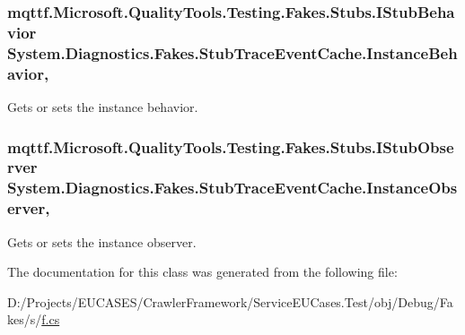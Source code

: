 \hypertarget{class_system_1_1_diagnostics_1_1_fakes_1_1_stub_trace_event_cache_aebba5c60a0123a425d6c08371730c595}{
\subsubsection[{Instance\-Behavior}]{\setlength{\rightskip}{0pt plus 5cm}mqttf.\-Microsoft.\-Quality\-Tools.\-Testing.\-Fakes.\-Stubs.\-I\-Stub\-Behavior System.\-Diagnostics.\-Fakes.\-Stub\-Trace\-Event\-Cache.\-Instance\-Behavior\hspace{0.3cm}{\ttfamily [get]}, {\ttfamily [set]}}}\label{class_system_1_1_diagnostics_1_1_fakes_1_1_stub_trace_event_cache_aebba5c60a0123a425d6c08371730c595}


Gets or sets the instance behavior.

\hypertarget{class_system_1_1_diagnostics_1_1_fakes_1_1_stub_trace_event_cache_a4ff74146dddb8b54a52dfdb06539b07b}{
\subsubsection[{Instance\-Observer}]{\setlength{\rightskip}{0pt plus 5cm}mqttf.\-Microsoft.\-Quality\-Tools.\-Testing.\-Fakes.\-Stubs.\-I\-Stub\-Observer System.\-Diagnostics.\-Fakes.\-Stub\-Trace\-Event\-Cache.\-Instance\-Observer\hspace{0.3cm}{\ttfamily [get]}, {\ttfamily [set]}}}\label{class_system_1_1_diagnostics_1_1_fakes_1_1_stub_trace_event_cache_a4ff74146dddb8b54a52dfdb06539b07b}


Gets or sets the instance observer.



The documentation for this class was generated from the following file\-:\begin{DoxyCompactItemize}
\item 
D\-:/\-Projects/\-E\-U\-C\-A\-S\-E\-S/\-Crawler\-Framework/\-Service\-E\-U\-Cases.\-Test/obj/\-Debug/\-Fakes/s/\hyperlink{s_2f_8cs}{f.\-cs}\end{DoxyCompactItemize}
